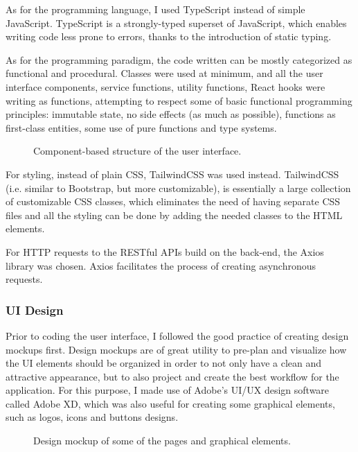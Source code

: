   As for the programming language, I used TypeScript instead of simple JavaScript. TypeScript is a strongly-typed superset of JavaScript, which enables writing code less prone to errors, thanks to the introduction of static typing. 

  As for the programming paradigm, the code written can be mostly categorized as functional and procedural. Classes were used at minimum, and all the user interface components, service functions, utility functions, React hooks were writing as functions, attempting to respect some of basic functional programming principles: immutable state, no side effects (as much as possible), functions as first-class entities, some use of pure functions and type systems.

  \begin{figure}[h]
    \centering
    \caption{Component-based structure of the user interface.}
  \end{figure}
  
  For styling, instead of plain CSS, TailwindCSS was used instead. TailwindCSS (i.e. similar to Bootstrap, but more customizable), is essentially a large collection of customizable CSS classes, which eliminates the need of having separate CSS files and all the styling can be done by adding the needed classes to the HTML elements.

  For HTTP requests to the RESTful APIs build on the back-end, the Axios library was chosen. Axios facilitates the process of creating asynchronous requests. 

\subsubsection{UI Design}
  Prior to coding the user interface, I followed the good practice of creating design mockups first. Design mockups are of great utility to pre-plan and visualize how the UI elements should be organized in order to not only have a clean and attractive appearance, but to also project and create the best workflow for the application. For this purpose, I made use of Adobe's UI/UX design software called Adobe XD, which was also useful for creating some graphical elements, such as logos, icons and buttons designs.

  \begin{figure}[h]
    \centering
    \caption{Design mockup of some of the pages and graphical elements.}
  \end{figure}

